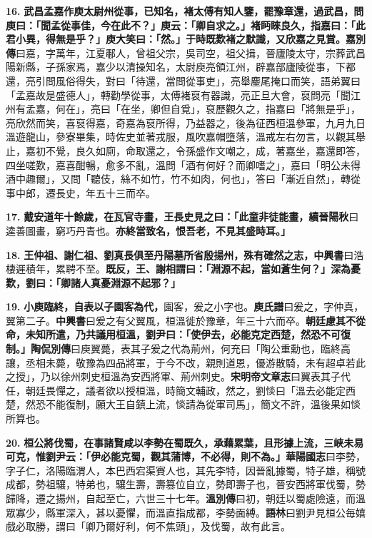 \textbf{16.} \textbf{武昌孟嘉作庾太尉州從事，已知名，褚太傅有知人鑒，罷豫章還，過武昌，問庾曰：「聞孟從事佳，今在此不？」庾云：「卿自求之。」褚眄睞良久，指嘉曰：「此君小異，得無是乎？」庾大笑曰：「然。」于時既歎褚之默識，又欣嘉之見賞。}{\footnotesize \textbf{嘉別傳}曰嘉，字萬年，江夏鄳人，曾祖父宗，吳司空，祖父揖，晉廬陵太守，宗葬武昌陽新縣，子孫家焉，嘉少以清操知名，太尉庾亮領江州，辟嘉部廬陵從事，下都還，亮引問風俗得失，對曰「待還，當問從事吏」，亮舉麈尾掩口而笑，語弟翼曰「孟嘉故是盛德人」，轉勸學從事，太傅褚裒有器識，亮正旦大會，裒問亮「聞江州有孟嘉，何在」，亮曰「在坐，卿但自覓」，裒歷觀久之，指嘉曰「將無是乎」，亮欣然而笑，喜裒得嘉，奇嘉為裒所得，乃益器之，後為征西桓溫參軍，九月九日溫遊龍山，參寮畢集，時佐史並著戎服，風吹嘉帽墮落，溫戒左右勿言，以觀其舉止，嘉初不覺，良久如廁，命取還之，令孫盛作文嘲之，成，著嘉坐，嘉還即答，四坐嗟歎，嘉喜酣暢，愈多不亂，溫問「酒有何好？而卿嗜之」，嘉曰「明公未得酒中趣爾」，又問「聽伎，絲不如竹，竹不如肉，何也」，答曰「漸近自然」，轉從事中郎，遷長史，年五十三而卒。}

\textbf{17.} \textbf{戴安道年十餘歲，在瓦官寺畫，王長史見之曰：「此童非徒能畫，}{\footnotesize \textbf{續晉陽秋}曰逵善圖畫，窮巧丹青也。}\textbf{亦終當致名，恨吾老，不見其盛時耳。」}

\textbf{18.} \textbf{王仲祖、謝仁祖、劉真長俱至丹陽墓所省殷揚州，殊有確然之志，}{\footnotesize \textbf{中興書}曰浩棲遲積年，累聘不至。}\textbf{既反，王、謝相謂曰：「淵源不起，當如蒼生何？」深為憂歎，劉曰：「卿諸人真憂淵源不起邪？」}

\textbf{19.} \textbf{小庾臨終，自表以子園客為代，}{\footnotesize 園客，爰之小字也。\textbf{庾氏譜}曰爰之，字仲真，翼第二子。\textbf{中興書}曰爰之有父翼風，桓溫徙於豫章，年三十六而卒。}\textbf{朝廷慮其不從命，未知所遣，乃共議用桓溫，劉尹曰：「使伊去，必能克定西楚，然恐不可復制。」}{\footnotesize \textbf{陶侃別傳}曰庾翼薨，表其子爰之代為荊州，何充曰「陶公重勳也，臨終高讓，丞相未薨，敬豫為四品將軍，于今不改，親則道恩，優游散騎，未有超卓若此之授」，乃以徐州刺史桓溫為安西將軍、荊州刺史。\textbf{宋明帝文章志}曰翼表其子代任，朝廷畏憚之，議者欲以授桓溫，時簡文輔政，然之，劉惔曰「溫去必能定西楚，然恐不能復制，願大王自鎮上流，惔請為從軍司馬」，簡文不許，溫後果如惔所算也。}

\textbf{20.} \textbf{桓公將伐蜀，在事諸賢咸以李勢在蜀既久，承藉累葉，且形據上流，三峽未易可克，惟劉尹云：「伊必能克蜀，觀其蒲博，不必得，則不為。」}{\footnotesize \textbf{華陽國志}曰李勢，字子仁，洛陽臨渭人，本巴西宕渠賨人也，其先李特，因晉亂據蜀，特子雄，稱號成都，勢祖驤，特弟也，驤生壽，壽篡位自立，勢即壽子也，晉安西將軍伐蜀，勢歸降，遷之揚州，自起至亡，六世三十七年。\textbf{溫別傳}曰初，朝廷以蜀處險遠，而溫眾寡少，縣軍深入，甚以憂懼，而溫直指成都，李勢面縛。\textbf{語林}曰劉尹見桓公毎嬉戲必取勝，謂曰「卿乃爾好利，何不焦頭」，及伐蜀，故有此言。}

